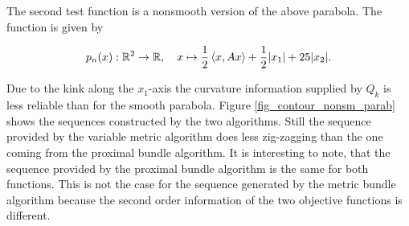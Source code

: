 The second test function is a nonsmooth version of the above parabola. The function is given by 

\[ p_n(x): \mathbb{R}^2 \to \mathbb{R}, \quad x \mapsto \frac{1}{2}\left\langle x, Ax \right\rangle + \frac{1}{2}|x_1|+25|x_2|. \]

Due to the kink along the \(x_1\)-axis the curvature information supplied by \(Q_k\) is less reliable than for the smooth parabola.
Figure \ref{fig_contour_nonsm_parab} shows the sequences constructed by the two algorithms. Still the sequence provided by the variable metric algorithm does less zig-zagging than the one coming from the proximal bundle algorithm.
It is interesting to note, that the sequence provided by the proximal bundle algorithm is the same for both functions. This is not the case for the sequence generated by the metric bundle algorithm because the second order information of the two objective functions is different.

